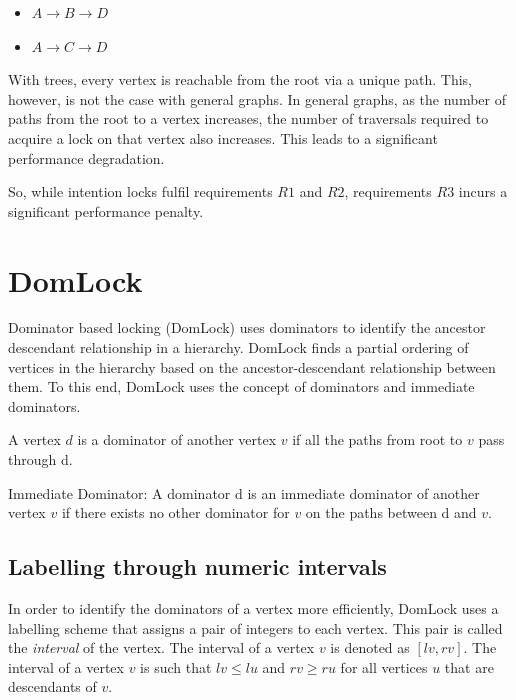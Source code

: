 \begin{itemize}
    \item $A \rightarrow B \rightarrow D$
    \item $A \rightarrow C \rightarrow D$
\end{itemize}

With trees, every vertex is reachable from the root via a unique path. 
This, however, is not the case with general graphs.
In general graphs, as the number of paths from the root to a vertex increases, the number of traversals required to acquire a lock on that vertex also increases.
This leads to a significant performance degradation. 

So, while intention locks fulfil requirements $R1$ and $R2$, requirements $R3$ incurs a significant performance penalty. 

\section{DomLock}

Dominator based locking (DomLock) \cite{kalikar2016domlock} uses dominators to identify the ancestor descendant relationship in a hierarchy. DomLock finds a partial ordering of vertices in the hierarchy based on the ancestor-descendant relationship between them. To this end, DomLock uses the concept of dominators and immediate dominators. 
\begin{definition}[Dominator]
    A vertex $d$ is a dominator of another vertex $v$ if all the paths from root to $v$ pass through d.
\end{definition}

\begin{definition}
    Immediate Dominator: A dominator d is an immediate dominator of another vertex $v$ if there exists no other dominator for $v$ on the paths between d and $v$.
\end{definition}

\subsection{Labelling through numeric intervals}
In order to identify the dominators of a vertex more efficiently, DomLock uses a labelling scheme that assigns a pair of integers to each vertex. This pair is called the \emph{interval} of the vertex. The interval of a vertex $v$ is denoted as $[lv, rv]$. 
The interval of a vertex $v$ is such that $lv \leq lu$ and $rv \geq ru$ for all vertices $u$ that are descendants of $v$. 

